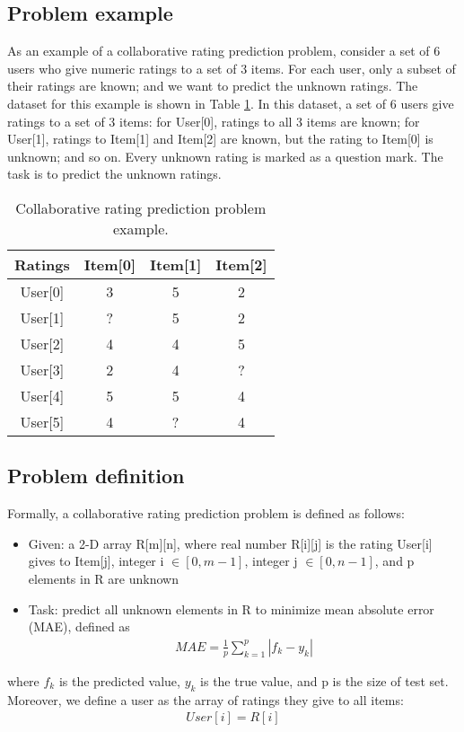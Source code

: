 \documentclass[sigconf]{acmart}
\begin{document}
\subsection{Problem example}
As an example of a collaborative rating prediction problem, consider 
a set of 6 users who give numeric ratings to a set of 3 items.
For each user, only a subset of their ratings are known; 
and we want to predict the unknown ratings.
The dataset for this example is shown in Table \ref{tab:ratings}.
In this dataset, a set of 6 users give ratings to a set of 3 items: 
for User[0], ratings to all 3 items are known; 
for User[1], ratings to Item[1] and Item[2] are known, 
but the rating to Item[0] is unknown; and so on.
Every unknown rating is marked as a question mark.
The task is to predict the unknown ratings.
\begin{table}[!htb]
	\centering
	\caption{Collaborative rating prediction problem example.}
	\begin{tabular}{cccc} \hline
		Ratings & Item[0] & Item[1] & Item[2] \\ \hline
		User[0] & 3       & 5       & 2 \\ \hline
		User[1] & ?       & 5       & 2 \\ \hline
		User[2] & 4       & 4       & 5 \\ \hline
		User[3] & 2       & 4       & ? \\ \hline
		User[4] & 5       & 5       & 4 \\ \hline
		User[5] & 4       & ?       & 4 \\ \hline
	\end{tabular}
	\label{tab:ratings}
\end{table}

\subsection{Problem definition}
Formally, a collaborative rating prediction problem is defined as follows:
\begin{itemize}
	\item Given: a 2-D array R[m][n], 
	where real number R[i][j] is the rating User[i] gives to Item[j],
	integer i $ \in [0, m-1] $, integer j $ \in [0, n-1] $,
	and p elements in R are unknown
	\item Task: predict all unknown elements in R to minimize mean absolute error (MAE), defined as
	\begin{align*}
	MAE = \frac{1}{p} \sum_{k = 1}^{p}|f_k - y_k|
	\end{align*}
\end{itemize}
where $ f_k $ is the predicted value, $ y_k $ is the true value, and p is the 
size of test set.
Moreover, we define a user as the array of ratings they give to all items: 
\begin{align*}
	User[i] = R[i]
\end{align*}
\end{document}

